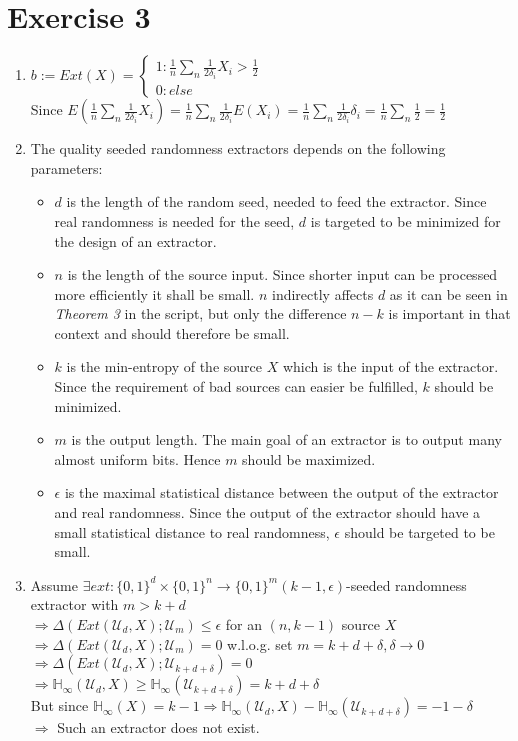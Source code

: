 \documentclass[11pt]{scrartcl}
\begin{document}
\section*{Exercise 3}
\begin{enumerate}
	\item $b:= Ext(X) = \begin{cases} 1: \frac{1}{n}\sum_n \frac{1}{2 \delta_i} X_i > \frac{1}{2}\\ 0: else\end{cases}$\\
	Since $E(\frac{1}{n}\sum_n \frac{1}{2 \delta_i} X_i)=\frac{1}{n}\sum_n \frac{1}{2 \delta_i} E(X_i) = \frac{1}{n}\sum_n \frac{1}{2 \delta_i} \delta_i = \frac{1}{n}\sum_n \frac{1}{2} = \frac{1}{2}$

	\item The quality seeded randomness extractors depends on the following parameters:
	\begin{itemize}
		\item $d$ is the length of the random seed, needed to feed the extractor. Since real randomness is needed for the seed, $d$ is targeted to be minimized for the design of an extractor.
		\item $n$ is the length of the source input. Since shorter input can be processed more efficiently it shall be small. $n$ indirectly affects $d$ as it can be seen in \emph{Theorem 3} in the script, but only the difference $n-k$ is important in that context and should therefore be small.
		\item $k$ is the min-entropy of the source $X$ which is the input of the extractor. Since the requirement of bad sources can easier be fulfilled, $k$ should be minimized.
		\item $m$ is the output length. The main goal of an extractor is to output many almost uniform bits. Hence $m$ should be maximized.
		\item $\epsilon$ is the maximal statistical distance between the output of the extractor and real randomness. Since the output of the extractor should have a small statistical distance to real randomness, $\epsilon$ should be targeted to be small.
	\end{itemize}

	\item Assume $\exists ext: \{0,1\}^d\times\{0,1\}^n\rightarrow\{0,1\}^m (k-1,\epsilon)$-seeded randomness extractor with $m>k+d$\\
	$\Rightarrow \Delta(Ext(\mathcal{U}_d,X);\mathcal{U}_m)\leq \epsilon$ for an $(n,k-1)$ source $X$\\
	$\Rightarrow \Delta(Ext(\mathcal{U}_d,X);\mathcal{U}_m)= 0$ w.l.o.g. set $m=k+d+\delta, \delta\to0$\\
	$\Rightarrow \Delta(Ext(\mathcal{U}_d,X);\mathcal{U}_{k+d+\delta})= 0$\\
	$\Rightarrow \mathbb{H}_\infty(\mathcal{U}_d,X) \geq \mathbb{H}_\infty(\mathcal{U}_{k+d+\delta})=k+d+\delta$\\
	But since $\mathbb{H}_\infty(X)=k-1 \Rightarrow \mathbb{H}_\infty(\mathcal{U}_d,X) - \mathbb{H}_\infty(\mathcal{U}_{k+d+\delta})=-1-\delta$\\
	$\Rightarrow$ Such an extractor does not exist.
\end{enumerate}
\end{document}
